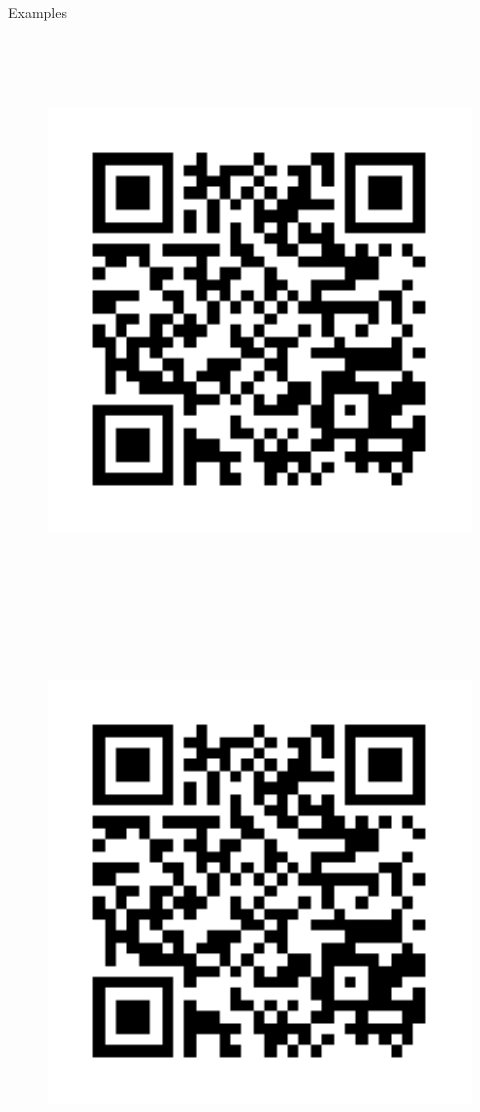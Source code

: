 \begin{block}{Examples}
    \begin{figure}
        \includegraphics[height=15cm]{ref1}
        \includegraphics[height=15cm]{ref1}
    \end{figure}

\end{block}

